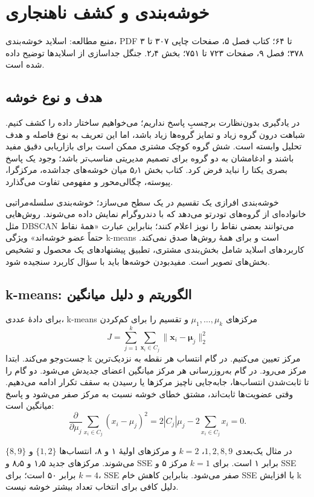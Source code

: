 \documentclass[12pt,a4paper,oneside]{report}
\newcommand{\source}[1]{\par{\small\color{muted} منبع مطالعه: #1}\par}
\begin{document}
\chapter{خوشه‌بندی و کشف ناهنجاری}
\source{اسلاید خوشه‌بندی، PDF ۳ تا ۶۴؛ کتاب فصل ۵، صفحات چاپی ۳۰۷ تا ۳۷۸؛ فصل ۹، صفحات ۷۲۳ تا ۷۵۱؛ بخش ۲٫۴. جنگل جداسازی از اسلایدها توضیح داده شده است.}
\section{هدف و نوع خوشه}

در یادگیری بدون‌نظارت برچسبِ پاسخ نداریم؛ می‌خواهیم ساختار داده را کشف کنیم. شباهت درون گروه زیاد و تمایز گروه‌ها زیاد باشد، اما این تعریف به نوع فاصله و هدف تحلیل وابسته است. شش گروه کوچک مشتری ممکن است برای بازاریابی دقیق مفید باشند و ادغامشان به دو گروه برای تصمیم مدیریتی مناسب‌تر باشد؛ وجود یک پاسخ بصری یکتا را نباید فرض کرد. کتاب بخش ۵٫۱ میان خوشه‌های جداشده، مرکزگرا، پیوسته، چگالی‌محور و مفهومی تفاوت می‌گذارد.

خوشه‌بندی افرازی یک تقسیم در یک سطح می‌سازد؛ خوشه‌بندی سلسله‌مراتبی خانواده‌ای از گروه‌های تودرتو می‌دهد که با دندروگرام نمایش داده می‌شوند. روش‌هایی مثل DBSCAN می‌توانند بعضی نقاط را نویز اعلام کنند؛ بنابراین عبارت «همهٔ نقاط حتماً عضو خوشه‌اند» ویژگی k-means است و برای همهٔ روش‌ها صدق نمی‌کند. کاربردهای اسلاید شامل بخش‌بندی مشتری، تطبیق پیشنهادهای یک محصول و تشخیص بخش‌های تصویر است. مفیدبودن خوشه‌ها باید با سؤال کاربرد سنجیده شود.

\section{k-means: الگوریتم و دلیل میانگین}

برای دادهٔ عددی، k-means مرکزهای \(\mu_1,\ldots,\mu_k\) و تقسیم را برای کم‌کردن \[
J=\sum_{j=1}^k\sum_{\boldsymbol x_i\in C_j}\|\boldsymbol x_i-\boldsymbol\mu_j\|_2^2
\] جست‌وجو می‌کند. ابتدا k مرکز تعیین می‌کنیم. در گام انتساب هر نقطه به نزدیک‌ترین مرکز می‌رود. در گام به‌روزرسانی هر مرکز میانگین اعضای جدیدش می‌شود. دو گام را تا ثابت‌شدن انتساب‌ها، جابه‌جایی ناچیز مرکزها یا رسیدن به سقف تکرار ادامه می‌دهیم. وقتی عضویت‌ها ثابت‌اند، مشتق خطای خوشه نسبت به مرکز صفر می‌شود و پاسخ میانگین است: \[
\frac{\partial}{\partial\mu_j}\sum_{x_i\in C_j}(x_i-\mu_j)^2=2|C_j|\mu_j-2\sum_{x_i\in C_j}x_i=0.
\]

در مثال یک‌بعدی \(1,2,8,9\)، $k=2$ و مرکزهای اولیهٔ ۱ و ۸، انتساب‌ها \(\{1,2\}\) و \(\{8,9\}\) می‌شوند. مرکزهای جدید ۱٫۵ و ۸٫۵ و SSE برابر ۱ است. برای $k=1$ مرکز ۵ و SSE برابر ۵۰ است؛ برای $k=4$، SSE صفر می‌شود. بنابراین کاهش خام SSE با افزایش k دلیل کافی برای انتخاب تعداد بیشتر خوشه نیست.
\end{document}
